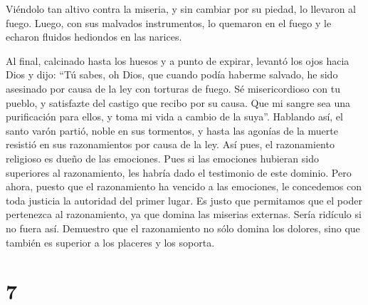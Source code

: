  Viéndolo tan altivo contra la miseria, y sin cambiar por
su piedad, lo llevaron al fuego.  Luego, con sus malvados
instrumentos, lo quemaron en el fuego y le echaron fluidos hediondos en
las narices.

 Al final, calcinado hasta los huesos y a punto de
expirar, levantó los ojos hacia Dios y dijo:  ``Tú sabes,
oh Dios, que cuando podía haberme salvado, he sido asesinado por causa
de la ley con torturas de fuego.  Sé misericordioso con
tu pueblo, y satisfazte del castigo que recibo por su causa.
 Que mi sangre sea una purificación para ellos, y toma mi
vida a cambio de la suya''.  Hablando así, el santo varón
partió, noble en sus tormentos, y hasta las agonías de la muerte
resistió en sus razonamientos por causa de la ley.  Así
pues, el razonamiento religioso es dueño de las emociones.
 Pues si las emociones hubieran sido superiores al
razonamiento, les habría dado el testimonio de este dominio.
 Pero ahora, puesto que el razonamiento ha vencido a las
emociones, le concedemos con toda justicia la autoridad del primer
lugar.  Es justo que permitamos que el poder pertenezca
al razonamiento, ya que domina las miserias externas. 
Sería ridículo si no fuera así. Demuestro que el razonamiento no sólo
domina los dolores, sino que también es superior a los placeres y los
soporta.

\hypertarget{section-6}{%
\section{7}\label{section-6}}

